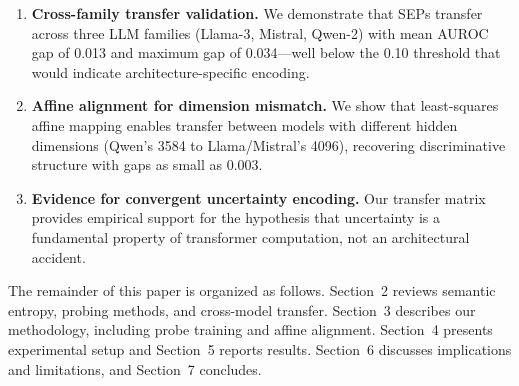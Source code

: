 \begin{enumerate}
\item \textbf{Cross-family transfer validation.} We demonstrate that SEPs transfer across three LLM families (Llama-3, Mistral, Qwen-2) with mean AUROC gap of 0.013 and maximum gap of 0.034---well below the 0.10 threshold that would indicate architecture-specific encoding.

\item \textbf{Affine alignment for dimension mismatch.} We show that least-squares affine mapping enables transfer between models with different hidden dimensions (Qwen's 3584 to Llama/Mistral's 4096), recovering discriminative structure with gaps as small as 0.003.

\item \textbf{Evidence for convergent uncertainty encoding.} Our transfer matrix provides empirical support for the hypothesis that uncertainty is a fundamental property of transformer computation, not an architectural accident.
\end{enumerate}

The remainder of this paper is organized as follows. Section~2 reviews semantic entropy, probing methods, and cross-model transfer. Section~3 describes our methodology, including probe training and affine alignment. Section~4 presents experimental setup and Section~5 reports results. Section~6 discusses implications and limitations, and Section~7 concludes.
